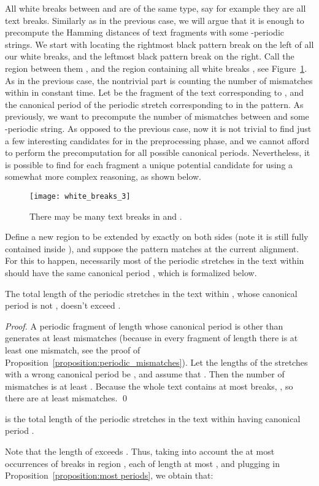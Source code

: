 \documentclass[runningheads]{llncs}
\begin{document}
\begin{mycases}[listparindent=15pt]
\item All white breaks between  and  are of the same type, say for example they are all text breaks. Similarly as in the previous case, we will argue that it is enough to precompute the Hamming distances of text fragments with some -periodic strings. We start with locating the rightmost black pattern break on the left of all our white breaks, and the leftmost black pattern break on the right. Call the region between them , and the region containing all white breaks , see Figure~\ref{figure:white_breaks_3}. As in the previous case, the nontrivial part is counting the number of mismatches within  in constant time. Let  be the fragment of the text corresponding to , and  the canonical period of the periodic stretch corresponding to  in the pattern. As previously, we want to precompute the number of mismatches between  and some -periodic string. As opposed to the previous case, now it is not trivial to find just a few interesting candidates for  in the preprocessing phase, and we cannot afford to perform the precomputation for all possible canonical periods. Nevertheless, it is possible to find for each fragment a unique potential candidate for  using a somewhat more complex reasoning, as shown below.

\begin{figure}[t]
\texttt{[image: white\_breaks\_3]}
\caption{There may be many text breaks in  and .}
\label{figure:white_breaks_3}
\end{figure}

Define a new region  to be  extended by exactly  on both sides (note it is still fully contained inside ), and suppose the pattern matches at the current alignment. For this to happen, necessarily most of the periodic stretches in the text within  should have the same canonical period , which is formalized below.
\begin{proposition}
\label{proposition:most periods}
The total length of the periodic stretches in the text within , whose canonical period is not , doesn't exceed . 
\end{proposition}
\begin{proof}
A periodic fragment of length  whose canonical period is other than  generates at least  mismatches (because in every fragment of length  there is at least one mismatch, see the proof of Proposition~\ref{proposition:periodic_mismatches}).
Let the lengths of the stretches with a wrong canonical period be , and assume that . Then the number of mismatches is at least .  Because the whole text contains at most  breaks, , so there are at least  mismatches.
\qed
\end{proof}
\begin{definition}
 is the total length of the periodic stretches in the text within  having canonical period .
\end{definition} 
Note that the length of  exceeds . Thus, taking into account the at most  occurrences of breaks in region , each of length at most , and plugging in Proposition~\ref{proposition:most periods}, we obtain that: 


\end{mycases}
\end{document}
